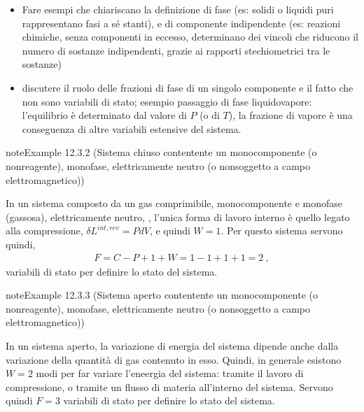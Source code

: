 \documentclass[letterpaper,10pt,italian]{jupyterBook}
\begin{document}
\sphinxAtStartPar
{}
\begin{itemize}
\item {} 
\sphinxAtStartPar
Fare esempi che chiariscano la definizione di fase (es: solidi o liquidi puri rappresentano fasi a sé stanti), e di componente indipendente (es: reazioni chimiche, senza componenti in eccesso, determinano dei vincoli che riducono il numero di sostanze indipendenti, grazie ai rapporti stechiometrici tra le sostanze)

\item {} 
\sphinxAtStartPar
discutere il ruolo delle frazioni di fase di un singolo componente e il fatto che non sono variabili di stato; esempio passaggio di fase liquido\sphinxhyphen{}vapore: l’equilibrio è determinato dal valore di \(P\) (o di \(T\)), la frazione di vapore è una conseguenza di altre variabili estensive del sistema.

\end{itemize}
\label{ch/thermodynamics/principles-gibbs-phase-rule:example-5}
\begin{sphinxadmonition}{note}{Example 12.3.2 (Sistema chiuso contentente un monocomponente (o non\sphinxhyphen{}reagente), monofase, elettricamente neutro (o non\sphinxhyphen{}soggetto a campo elettromagnetico))}



\sphinxAtStartPar
In un sistema composto da un gas comprimibile, monocomponente e monofase (gassosa), elettricamente neutro,  , l’unica forma di lavoro interno è quello legato alla compressione, \(\delta L^{int,rev} = P dV\), e quindi \(W = 1\). Per questo sistema servono quindi,
\begin{equation*}
\begin{split}F = C - P + 1 + W = 1 - 1 + 1 + 1 = 2 \ ,\end{split}
\end{equation*}
\sphinxAtStartPar
variabili di stato per definire lo stato del sistema.
\end{sphinxadmonition}
\label{ch/thermodynamics/principles-gibbs-phase-rule:example-6}
\begin{sphinxadmonition}{note}{Example 12.3.3 (Sistema aperto contentente un monocomponente (o non\sphinxhyphen{}reagente), monofase, elettricamente neutro (o non\sphinxhyphen{}soggetto a campo elettromagnetico))}



\sphinxAtStartPar
In un sistema aperto, la variazione di energia del sistema dipende anche dalla variazione della quantità di gas contenuto in esso. Quindi, in generale esistono \(W = 2\) modi per far variare l’eneergia del sistema: tramite il lavoro di compressione, o tramite un flusso di materia all’interno del sistema. Servono quindi \(F=3\) variabili di stato per definire lo stato del sistema.
\end{sphinxadmonition}
\end{document}
